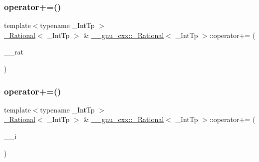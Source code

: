 \subsubsection{\texorpdfstring{operator+=()}{operator+=()}\hspace{0.1cm}{\footnotesize\ttfamily [1/2]}}
{\footnotesize\ttfamily template$<$typename \+\_\+\+Int\+Tp $>$ \\
\hyperlink{class____gnu__cxx_1_1__Rational}{\+\_\+\+Rational}$<$ \+\_\+\+Int\+Tp $>$ \& \hyperlink{class____gnu__cxx_1_1__Rational}{\+\_\+\+\_\+gnu\+\_\+cxx\+::\+\_\+\+Rational}$<$ \+\_\+\+Int\+Tp $>$\+::operator+= (\begin{DoxyParamCaption}\item[{\hyperlink{class____gnu__cxx_1_1__Rational}{\+\_\+\+Rational}$<$ \+\_\+\+Int\+Tp $>$}]{\+\_\+\+\_\+rat }\end{DoxyParamCaption})}

\mbox{\label{class____gnu__cxx_1_1__Rational_ad0b5ad9fd1dadea8c147d0d4758f3a5e}} 
\subsubsection{\texorpdfstring{operator+=()}{operator+=()}\hspace{0.1cm}{\footnotesize\ttfamily [2/2]}}
{\footnotesize\ttfamily template$<$typename \+\_\+\+Int\+Tp $>$ \\
\hyperlink{class____gnu__cxx_1_1__Rational}{\+\_\+\+Rational}$<$ \+\_\+\+Int\+Tp $>$ \& \hyperlink{class____gnu__cxx_1_1__Rational}{\+\_\+\+\_\+gnu\+\_\+cxx\+::\+\_\+\+Rational}$<$ \+\_\+\+Int\+Tp $>$\+::operator+= (\begin{DoxyParamCaption}\item[{\hyperlink{class____gnu__cxx_1_1__Rational_a7987be70fc59d0d980621fd65828b74a}{value\+\_\+type}}]{\+\_\+\+\_\+i }\end{DoxyParamCaption})\hspace{0.3cm}{\ttfamily [inline]}}

\mbox{\label{class____gnu__cxx_1_1__Rational_ab09a2944b0630948c1ae9a33e9bdd131}} 
